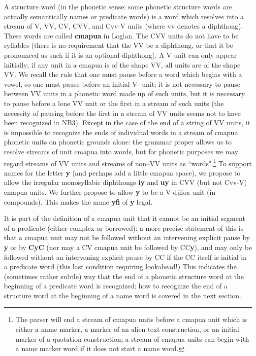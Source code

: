 \documentclass[12pt]{book}
\begin{document}
A structure word (in the phonetic sense:  some phonetic structure words are actually semantically names or predicate words)  is a word which resolves into a stream of
V, VV, CV, CVV, and Cvv-V units (where vv denotes a diphthong).  These words are called {\bf cmapua} in Loglan.  The CVV units do not have to be syllables (there is no requirement
that the VV be a diphthong, or that it be pronounced as such if it is an optional diphthong).  A V unit can only appear initially;  if any unit in a cmapua is of the shape VV, all units are of the shape VV.  We recall the rule that one must pause before
a word which begins with a vowel, so one must pause before an initial V- unit;  it is not necessary to pause between VV units in a phonetic word made up of such units, but it is necessary to pause before a lone VV unit or the first in a stream of such units (the necessity of pausing before the first in a stream of VV units seems not to have been recognized in NB3).  Except in the case of the end of a string of VV units, it is impossible to recognize the ends of individual words in a stream of cmapua phonetic units on phonetic grounds alone:  the grammar proper allows us to resolve streams of unit cmapua into words, but for phonetic purposes we may regard streams of VV units and streams of non--VV units as ``words".\footnote{The parser will end a stream of cmapua units before a cmapua unit which is either a name marker, a marker of an alien text construction, or an initial marker of a quotation construction; a stream of cmapua units can begin with a name marker word if it does not start a name word.}  
To support names for the letter {\bf y} (and perhaps add a little cmapua space), we propose to allow the irregular monosyllabic diphthongs
{\bf iy} and {\bf uy} in CVV (but not Cvv-V) cmapua units.  We further propose to allow {\bf y} to be a V djifoa unit (in compounds).  This makes the
name {\bf yfi} of {\bf y} legal.

It is part of the definition of a cmapua unit that it cannot be an initial segment of a predicate (either complex or borrowed):  a more precise statement of this is that a cmapua unit may not be followed without an intervening explicit pause by {\bf y} or by {\bf CyC} (nor may a CV cmapua unit be followed by CC{\bf y}), and may only be followed without an intervening explicit pause by CC if the CC itself is initial in a predicate word (this last condition requiring lookahead!)  This indicates the (sometimes rather subtle) way that the end of a phonetic structure word at the beginning of a predicate word is recognized;  how to recognize the end of a structure word at the beginning of a name word is covered in the next section.
\end{document}
